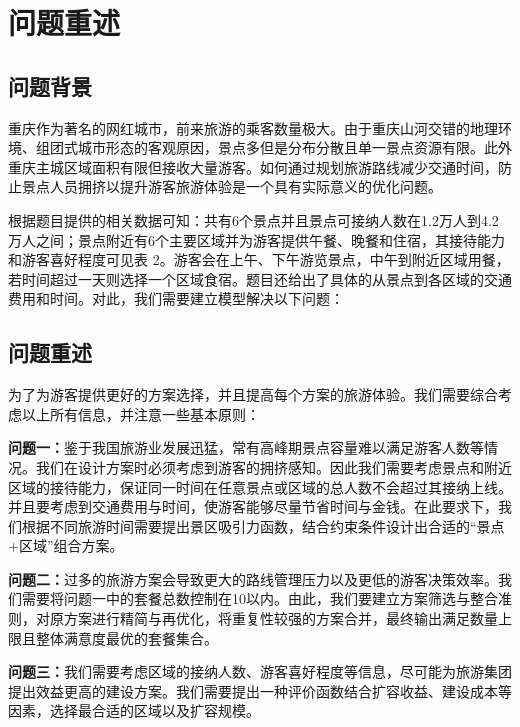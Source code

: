 \chapter[\hspace{0pt}问题重述]{{\heiti{}\hspace{0pt}问题重述}}\label{chapter1: 问题重述}
\removelofgap
\removelotgap
\setcounter{page}{2}  %

\section[\hspace{-2pt}问题背景]{{\heiti{} \hspace{-8pt}问题背景}}\label{section1: 问题背景}

重庆作为著名的网红城市，前来旅游的乘客数量极大。由于重庆山河交错的地理环境、组团式城市形态的客观原因，景点多但是分布分散且单一景点资源有限。此外重庆主城区域面积有限但接收大量游客。如何通过规划旅游路线减少交通时间，防止景点人员拥挤以提升游客旅游体验是一个具有实际意义的优化问题。

根据题目提供的相关数据可知：共有6个景点并且景点可接纳人数在1.2万人到4.2万人之间；景点附近有6个主要区域并为游客提供午餐、晚餐和住宿，其接待能力和游客喜好程度可见表 2。游客会在上午、下午游览景点，中午到附近区域用餐，若时间超过一天则选择一个区域食宿。题目还给出了具体的从景点到各区域的交通费用和时间。对此，我们需要建立模型解决以下问题：

\section[\hspace{-2pt}问题重述]{{\heiti{} \hspace{-8pt}问题重述}}\label{section1: 问题重述}

为了为游客提供更好的方案选择，并且提高每个方案的旅游体验。我们需要综合考虑以上所有信息，并注意一些基本原则：

\textbf{问题一：}鉴于我国旅游业发展迅猛，常有高峰期景点容量难以满足游客人数等情况。我们在设计方案时必须考虑到游客的拥挤感知。\cite{BJGD201812009}因此我们需要考虑景点和附近区域的接待能力，保证同一时间在任意景点或区域的总人数不会超过其接纳上线。并且要考虑到交通费用与时间，使游客能够尽量节省时间与金钱。在此要求下，我们根据不同旅游时间需要提出景区吸引力函数，结合约束条件设计出合适的“景点+区域”组合方案。


\textbf{问题二：}过多的旅游方案会导致更大的路线管理压力以及更低的游客决策效率。我们需要将问题一中的套餐总数控制在10以内。由此，我们要建立方案筛选与整合准则，对原方案进行精简与再优化，将重复性较强的方案合并，最终输出满足数量上限且整体满意度最优的套餐集合。

\textbf{问题三：}我们需要考虑区域的接纳人数、游客喜好程度等信息，尽可能为旅游集团提出效益更高的建设方案。我们需要提出一种评价函数结合扩容收益、建设成本等因素，选择最合适的区域以及扩容规模。

